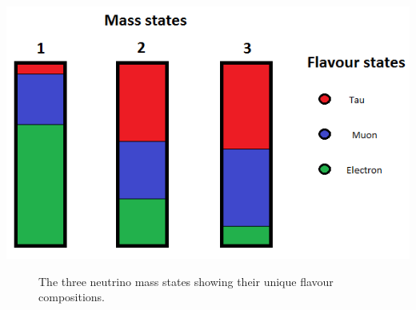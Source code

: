 \documentclass[12pt]{article}
\begin{document}
\begin{center}
\includegraphics[scale=0.5]{mixing.png}
\begin{figure}[h!]
\caption{The three neutrino mass states showing their unique flavour compositions.}
\label{fig:mixing}
\end{figure}
\end{center}
\end{document}
